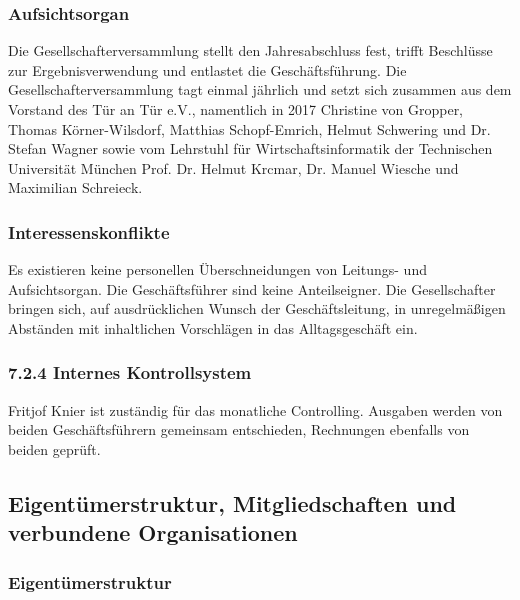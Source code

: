 \documentclass[12pt, a4paper]{article} %
\begin{document}
\hypertarget{aufsichtsorgan}{%
\subsubsection{Aufsichtsorgan}\label{aufsichtsorgan}}

Die Gesellschafterversammlung stellt den Jahresabschluss fest, trifft
Beschlüsse zur Ergebnisverwendung und entlastet die Geschäftsführung.
Die Gesellschafterversammlung tagt einmal jährlich und setzt sich
zusammen aus dem Vorstand des Tür an Tür e.V., namentlich in 2017
Christine von Gropper, Thomas Körner-Wilsdorf, Matthias Schopf-Emrich,
Helmut Schwering und Dr. Stefan Wagner sowie vom Lehrstuhl für
Wirtschaftsinformatik der Technischen Universität München Prof. Dr.
Helmut Krcmar, Dr. Manuel Wiesche und Maximilian Schreieck.

\hypertarget{interessenskonflikte}{%
\subsubsection{Interessenskonflikte}\label{interessenskonflikte}}

Es existieren keine personellen Überschneidungen von Leitungs- und
Aufsichtsorgan. Die Geschäftsführer sind keine Anteilseigner. Die
Gesellschafter bringen sich, auf ausdrücklichen Wunsch der
Geschäftsleitung, in unregelmäßigen Abständen mit inhaltlichen
Vorschlägen in das Alltagsgeschäft ein.

\hypertarget{internes-kontrollsystem}{%
\subsubsection{7.2.4 Internes
Kontrollsystem}\label{internes-kontrollsystem}}

Fritjof Knier ist zuständig für das monatliche Controlling. Ausgaben
werden von beiden Geschäftsführern gemeinsam entschieden, Rechnungen
ebenfalls von beiden geprüft.

\hypertarget{eigentuxfcmerstruktur-mitgliedschaften-und-verbundene-organisationen}{%
\subsection{Eigentümerstruktur, Mitgliedschaften und verbundene
Organisationen}\label{eigentuxfcmerstruktur-mitgliedschaften-und-verbundene-organisationen}}

\hypertarget{eigentuxfcmerstruktur}{%
\subsubsection{Eigentümerstruktur}\label{eigentuxfcmerstruktur}}
\end{document}
